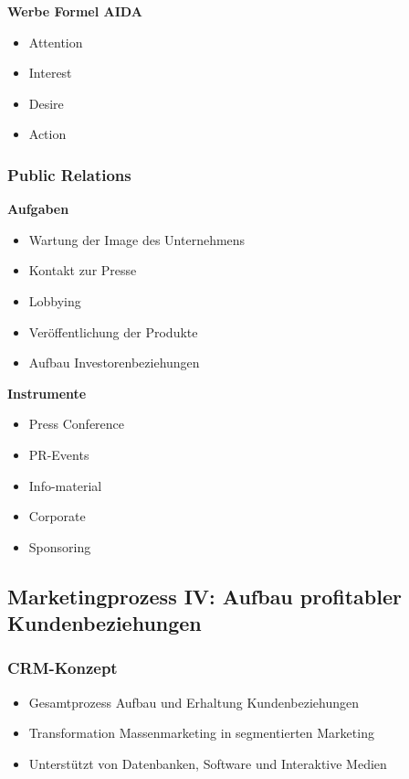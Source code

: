 \textbf{Werbe Formel AIDA}
\begin{itemize}
    \item Attention
    \item Interest
    \item Desire
    \item Action
\end{itemize}

\subsubsection{Public Relations}

\textbf{Aufgaben}
\begin{itemize}
    \item Wartung der Image des Unternehmens
    \item Kontakt zur Presse
    \item Lobbying 
    \item Veröffentlichung der Produkte
    \item Aufbau Investorenbeziehungen
\end{itemize}

\textbf{Instrumente}
\begin{itemize}
    \item Press Conference
    \item PR-Events
    \item Info-material
    \item Corporate
    \item Sponsoring
\end{itemize}

\subsection{Marketingprozess IV: Aufbau profitabler Kundenbeziehungen}

\subsubsection{CRM-Konzept}
\begin{itemize}
    \item Gesamtprozess Aufbau und Erhaltung Kundenbeziehungen
    \item Transformation Massenmarketing in segmentierten Marketing
    \item Unterstützt von Datenbanken, Software und Interaktive Medien
\end{itemize}

